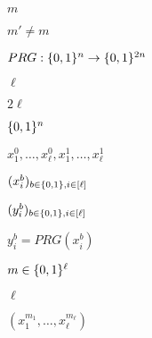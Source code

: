 \documentclass[10pt]{book}
\begin{document}
\begin{mdSnippets}
\begin{mdInlineSnippet}[6f8f57715090da2632453988d9a1501b]
$m$\end{mdInlineSnippet}%
\begin{mdInlineSnippet}[f24c5019dc192e1a061c977cd158dd69]%
$m' \neq m$\end{mdInlineSnippet}%
\begin{mdInlineSnippet}%
$PRG:\{0,1\}^n\rightarrow\{0,1\}^{2n}$\end{mdInlineSnippet}%
\begin{mdInlineSnippet}[ee5e5c003694e7cd5ae404923c665edb]%
$\ell$\end{mdInlineSnippet}%
\begin{mdInlineSnippet}[3fde7703383eb016915ab297a6236970]%
$2\ell$\end{mdInlineSnippet}%
\begin{mdInlineSnippet}[5867c9b098884eca2779f6d98d4b0b29]%
$\{0,1\}^n$\end{mdInlineSnippet}%
\begin{mdInlineSnippet}[0023e5fe577400cc8fa2f0a46bda8963]%
$x^0_1,\ldots,x^0_\ell,x^1_1,\ldots,x^1_\ell$\end{mdInlineSnippet}%
\begin{mdInlineSnippet}[4d79a0e2f22b62f229ed250686ef72bf]%
$( x^b_i )_{b\in\{0,1\},i\in[\ell]}$\end{mdInlineSnippet}%
\begin{mdInlineSnippet}[a1566f663365b491ca8c407a246c819a]%
$( y^b_i )_{b\in\{0,1\},i\in[\ell]}$\end{mdInlineSnippet}%
\begin{mdInlineSnippet}%
$y_i^b = PRG(x_i^b)$\end{mdInlineSnippet}%
\begin{mdInlineSnippet}[9186e55d259c2a7266e3d06dfc1bc4d0]%
$m\in \{0,1\}^\ell$\end{mdInlineSnippet}%
\begin{mdInlineSnippet}[ee5e5c003694e7cd5ae404923c665edb]%
$\ell$\end{mdInlineSnippet}%
\begin{mdInlineSnippet}[a344cc4dba1e645c533f85a84be181af]%
$(x^{m_1}_1,\ldots,x^{m_\ell}_\ell)$\end{mdInlineSnippet}%

\end{mdSnippets}
\end{document}
